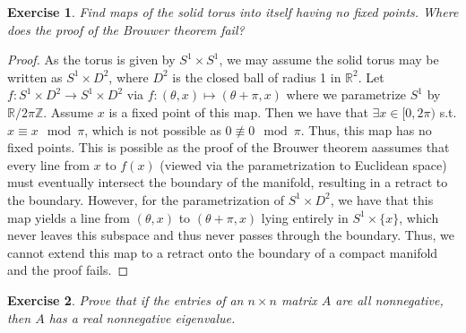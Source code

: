 \documentclass{article}
\newtheorem{exercise}{Exercise}
\begin{document}
\begin{exercise}
  Find maps of the solid torus into itself having no fixed points. Where does the proof of the Brouwer theorem fail?
  \end{exercise}

  \begin{proof}
    As the torus is given by $S^{1}\times S^{1}$, we may assume the solid torus may be written as $S^{1} \times D^{2}$, where $D^{2}$ is the closed ball of radius 1 in $\mathbb{R}^{2}$. Let $f:S^{1}\times D^{2}\to S^{1} \times D^{2}$ via $f:(\theta,x) \mapsto (\theta + \pi, x)$ where we parametrize $S^{1}$ by $\mathbb{R}/2\pi\mathbb{Z}$. Assume $x$ is a fixed point of this map. Then we have that $\exists x \in [0,2\pi)$ s.t. $x \equiv x \mod \pi$, which is not possible as $0 \not\equiv 0\mod \pi$. Thus, this map has no fixed points. This is possible as the proof of the Brouwer theorem aassumes that every line from $x$ to $f(x)$ (viewed via the parametrization to Euclidean space) must eventually intersect the boundary of the manifold, resulting in a retract to the boundary. However, for the parametrization of $S^{1} \times D^{2}$, we have that this map yields a line from $(\theta,x)$ to $(\theta + \pi, x)$ lying entirely in $S^{1}\times\{x\}$, which never leaves this subspace and thus never passes through the boundary. Thus, we cannot extend this map to a retract onto the boundary of a compact manifold and the proof fails. 
  \end{proof}

  \begin{exercise}
    Prove that if the entries of an $n \times n$ matrix $A$ are all nonnegative, then $A$ has a real nonnegative eigenvalue. 
  \end{exercise}
\end{document}
